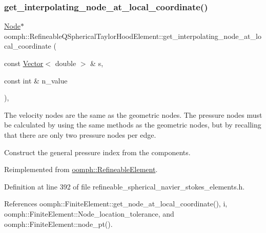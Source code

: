 \subsubsection{\texorpdfstring{get\+\_\+interpolating\+\_\+node\+\_\+at\+\_\+local\+\_\+coordinate()}{get\_interpolating\_node\_at\_local\_coordinate()}}
{\footnotesize\ttfamily \hyperlink{classoomph_1_1Node}{Node}$\ast$ oomph\+::\+Refineable\+Q\+Spherical\+Taylor\+Hood\+Element\+::get\+\_\+interpolating\+\_\+node\+\_\+at\+\_\+local\+\_\+coordinate (\begin{DoxyParamCaption}\item[{const \hyperlink{classoomph_1_1Vector}{Vector}$<$ double $>$ \&}]{s,  }\item[{const int \&}]{n\+\_\+value }\end{DoxyParamCaption})\hspace{0.3cm}{\ttfamily [inline]}, {\ttfamily [virtual]}}



The velocity nodes are the same as the geometric nodes. The pressure nodes must be calculated by using the same methods as the geometric nodes, but by recalling that there are only two pressure nodes per edge. 

Construct the general pressure index from the components. 

Reimplemented from \hyperlink{classoomph_1_1RefineableElement_ad920e66c00888c450f926f08c7793f78}{oomph\+::\+Refineable\+Element}.



Definition at line 392 of file refineable\+\_\+spherical\+\_\+navier\+\_\+stokes\+\_\+elements.\+h.



References oomph\+::\+Finite\+Element\+::get\+\_\+node\+\_\+at\+\_\+local\+\_\+coordinate(), i, oomph\+::\+Finite\+Element\+::\+Node\+\_\+location\+\_\+tolerance, and oomph\+::\+Finite\+Element\+::node\+\_\+pt().

\mbox{\label{classoomph_1_1RefineableQSphericalTaylorHoodElement_a3d72f67b7cb920fb9d006b440fd02922}} 
